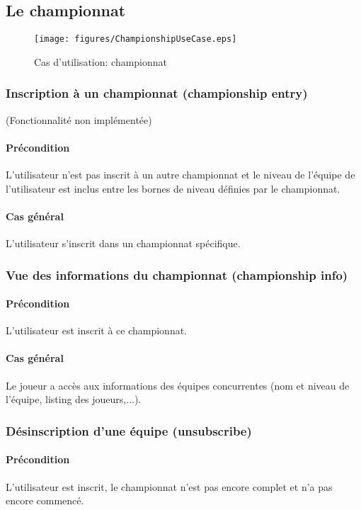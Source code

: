 \subsection{Le championnat}

\begin{figure}[h!]
  \centering
  \texttt{[image: figures/ChampionshipUseCase.eps]}
  \caption{\label{fig:UC:Championship} Cas d'utilisation: championnat}
\end{figure}

\subsubsection{Inscription à un championnat (championship entry)}
(Fonctionnalité non implémentée)
\paragraph{Précondition}
L'utilisateur n'est pas inscrit à un autre championnat et  le niveau de l'équipe de l'utilisateur est inclus entre les bornes de niveau définies par le championnat.
\paragraph{Cas général} L'utilisateur s'inscrit dans un championnat spécifique.

\subsubsection{Vue des informations du championnat (championship info)}
	\paragraph{Précondition} L'utilisateur est inscrit à ce championnat.
	\paragraph{Cas général} Le joueur a accès aux informations des équipes concurrentes 
		  (nom et niveau de l'équipe, listing des joueurs,...).

\subsubsection{Désinscription d'une équipe (unsubscribe)}
	\paragraph{Précondition} L'utilisateur est inscrit, le championnat n'est pas encore 
		  complet et n'a pas encore commencé.
